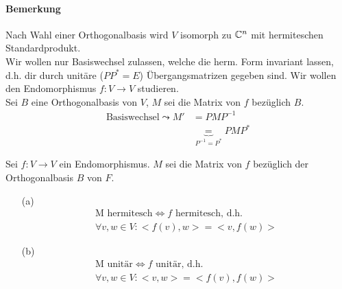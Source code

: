 \paragraph{Bemerkung}
Nach Wahl einer Orthogonalbasis wird $V$ isomorph zu $\mathbb{C}^n$ mit hermiteschen Standardprodukt. \\
Wir wollen nur Basiswechsel zulassen, welche die herm. Form invariant lassen, d.h. dir durch unitäre ($PP^{*} = E$) Übergangsmatrizen gegeben sind. Wir wollen den Endomorphismus $f: V \rightarrow V$ studieren. \\
Sei $B$ eine Orthogonalbasis von $V$, $M$ sei die Matrix von $f$ bezüglich $B$. \\

\begin{align} 
\text{Basiswechsel} \leadsto M' &= PMP^{-1} \\
&\underbrace{=}_{P^{-1} = P^{*}} PMP^{*}
\end{align}

\begin{satz} %
\label{satz551}
Sei $f: V \rightarrow V$ ein Endomorphismus. $M$ sei die Matrix von $f$ bezüglich der Orthogonalbasis $B$ von $F$.
\begin{itemize}
\item[(a)] 
\begin{align}
\text{M hermitesch} \Leftrightarrow f \text{ hermitesch, d.h.} \\
\forall v, w \in V: <f(v), w> = <v, f(w)>
\end{align}
\item[(b)] 
\begin{align}
\text{M unitär} \Leftrightarrow f \text{ unitär, d.h.} \\
\forall v, w \in V: <v, w> = <f(v), f(w)>
\end{align}
\end{itemize}
\end{satz}

